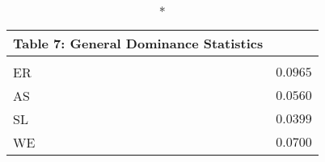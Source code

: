 \begin{longtable}{l|r}
\caption*{
{\large Table 7: General Dominance Statistics}
} \\ 
\toprule
\multicolumn{1}{l}{} &  \\ 
\midrule\addlinespace[2.5pt]
ER & $0.0965$ \\ 
AS & $0.0560$ \\ 
SL & $0.0399$ \\ 
WE & $0.0700$ \\ 
\bottomrule
\end{longtable}

